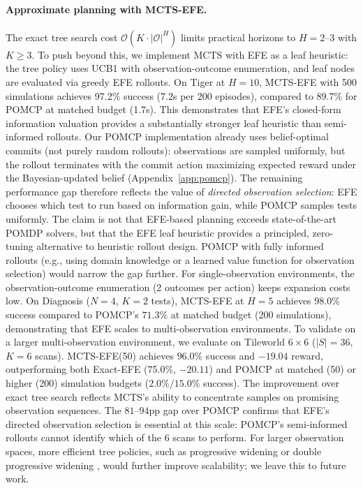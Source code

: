 \documentclass[runningheads]{llncs}
\begin{document}
\paragraph{Approximate planning with MCTS-EFE.}
The exact tree search cost $\mathcal{O}(K \cdot |\mathcal{O}|^H)$ limits practical horizons to $H{=}2$--$3$ with $K \geq 3$. To push beyond this, we implement MCTS with EFE as a leaf heuristic: the tree policy uses UCB1 with observation-outcome enumeration, and leaf nodes are evaluated via greedy EFE rollouts. On Tiger at $H{=}10$, MCTS-EFE with 500 simulations achieves 97.2\% success (7.2s per 200 episodes), compared to 89.7\% for POMCP at matched budget (1.7s). This demonstrates that EFE's closed-form information valuation provides a substantially stronger leaf heuristic than semi-informed rollouts. Our POMCP implementation already uses belief-optimal commits (not purely random rollouts): observations are sampled uniformly, but the rollout terminates with the commit action maximizing expected reward under the Bayesian-updated belief (Appendix~\ref{app:pomcp}). The remaining performance gap therefore reflects the value of \emph{directed observation selection}: EFE chooses which test to run based on information gain, while POMCP samples tests uniformly. The claim is not that EFE-based planning exceeds state-of-the-art POMDP solvers, but that the EFE leaf heuristic provides a principled, zero-tuning alternative to heuristic rollout design. POMCP with fully informed rollouts (e.g., using domain knowledge or a learned value function for observation selection) would narrow the gap further. For single-observation environments, the observation-outcome enumeration (2 outcomes per action) keeps expansion costs low. On Diagnosis ($N{=}4$, $K{=}2$ tests), MCTS-EFE at $H{=}5$ achieves $98.0\%$ success compared to POMCP's $71.3\%$ at matched budget (200 simulations), demonstrating that EFE scales to multi-observation environments. To validate on a larger multi-observation environment, we evaluate on Tileworld $6{\times}6$ ($|S|{=}36$, $K{=}6$ scans). MCTS-EFE(50) achieves $96.0\%$ success and $-19.04$ reward, outperforming both Exact-EFE (75.0\%, $-20.11$) and POMCP at matched (50) or higher (200) simulation budgets ($2.0\%$/$15.0\%$ success). The improvement over exact tree search reflects MCTS's ability to concentrate samples on promising observation sequences. The $81$--$94$pp gap over POMCP confirms that EFE's directed observation selection is essential at this scale: POMCP's semi-informed rollouts cannot identify which of the 6 scans to perform. For larger observation spaces, more efficient tree policies, such as progressive widening or double progressive widening \citep{benchetrit2025}, would further improve scalability; we leave this to future work.
\end{document}
